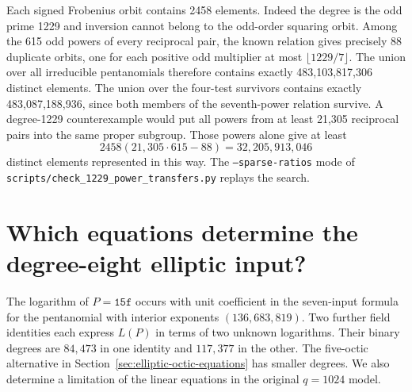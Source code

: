 \documentclass[11pt]{article}
\begin{document}
Each signed Frobenius orbit contains 2458 elements. Indeed the
degree is the odd prime 1229 and inversion cannot belong to the
odd-order squaring orbit. Among the 615 odd powers of every reciprocal
pair, the known relation gives precisely 88 duplicate orbits, one
for each positive odd multiplier at most \(\lfloor1229/7\rfloor\).
The union over all irreducible pentanomials therefore contains exactly
483,103,817,306 distinct elements. The union over the four-test
survivors contains exactly 483,087,188,936, since both members of the
seventh-power relation survive. A degree-1229 counterexample would
put all powers from at least 21,305 reciprocal pairs into the same
proper subgroup. Those powers alone give at least
\[
          2458(21{,}305\cdot615-88)=32{,}205{,}913{,}046
\]
distinct elements represented in this way. The
\texttt{--sparse-ratios} mode of
\nolinkurl{scripts/check_1229_power_transfers.py} replays the search.

\section{Which equations determine the degree-eight elliptic input?}
\label{sec:octic-free-branches}
The logarithm of \(P=\mathtt{15f}\) occurs with unit coefficient in
the seven-input formula for the pentanomial with interior exponents
\((136,683,819)\). Two further field identities each express \(L(P)\)
in terms of two unknown logarithms. Their binary degrees are \(84,473\)
in one identity and \(117,377\) in the other. The five-octic alternative
in Section~\ref{sec:elliptic-octic-equations} has smaller degrees.
We also determine a limitation of the linear equations in the
original \(q=1024\) model.
\end{document}

